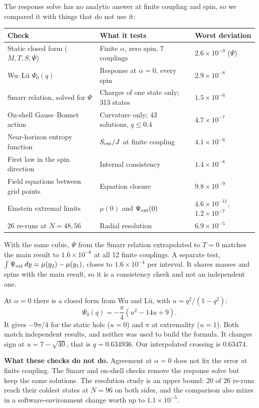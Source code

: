 \documentclass[12pt,a4paper]{article}
\begin{document}
The response solve has no analytic answer at finite coupling and spin, so we compared
it with things that do not use it:

\begin{center}\small
\begin{tabular}{@{}p{}p{}p{}@{}}
\hline
Check & What it tests & Worst deviation \\ \hline
Static closed form ($M,T,S,\Psi$) & Finite $\alpha$, zero spin, 7 couplings & $2.6\times10^{-9}$ ($\Psi$) \\
Wu--L\"u $\Psi_0(q)$ & Response at $\alpha=0$, every spin & $2.9\times10^{-8}$ \\
Smarr relation, solved for $\Psi$ & Charges of one state only; 313 states & $1.5\times10^{-6}$ \\
On-shell Gauss--Bonnet action & Curvature only; 43 solutions, $q\le0.4$ & $4.7\times10^{-7}$ \\
Near-horizon entropy function & $S_{\rm ext}/J$ at finite coupling & $4.1\times10^{-6}$ \\
First law in the spin direction & Internal consistency & $1.4\times10^{-8}$ \\
Field equations between grid points & Equation closure & $9.8\times10^{-9}$ \\
Einstein extremal limits & $\mu(0)$ and $\Psi_{\rm ext}(0)$ & $4.6\times10^{-11}$, $1.2\times10^{-7}$ \\
26 re-runs at $N=48,56$ & Radial resolution & $6.9\times10^{-5}$ \\ \hline
\end{tabular}
\end{center}

With the same cubic, $\Psi$ from the Smarr relation extrapolated to $T=0$ matches the
main result to $1.6\times10^{-6}$ at all 12 finite couplings. A separate test,
$\int\Psi_{\rm ext}\,dy=\mu(y_2)-\mu(y_1)$, closes to $1.6\times10^{-4}$ per interval.
It shares masses and spins with the main result, so it is a consistency check and
not an independent one.

At $\alpha=0$ there is a closed form from Wu and L\"u, with $u=q^2/(1-q^2)$:
\[
\Psi_0(q)=-\frac{\pi}{4}\left(u^2-14u+9\right).
\]
It gives $-9\pi/4$ for the static hole ($u=0$) and $\pi$ at extremality ($u=1$). Both
match independent results, and neither was used to build the formula. It changes
sign at $u=7-\sqrt{40}$, that is $q=0.634936$. Our interpolated crossing is $0.63474$.

\textbf{What these checks do not do.} Agreement at $\alpha=0$ does not fix the error
at finite coupling. The Smarr and on-shell checks remove the response solve but keep
the same solutions. The resolution study is an upper bound: 20 of 26 re-runs reach
their coldest states at $N=96$ on both sides, and the comparison also mixes in a
software-environment change worth up to $1.1\times10^{-5}$.
\end{document}
